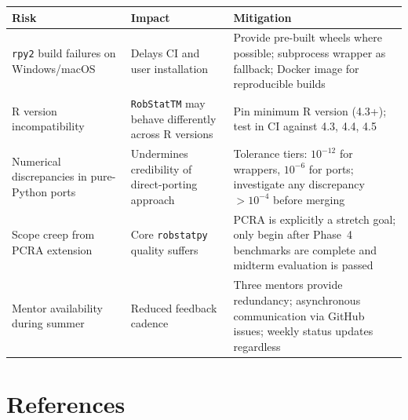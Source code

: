 \documentclass[11pt, a4paper]{article}
\begin{document}
\renewcommand{\arraystretch}{1.3}
\begin{tabularx}{\linewidth}{@{} >{\raggedright\arraybackslash}p{3.5cm}
                                  >{\raggedright\arraybackslash}X
                                  >{\raggedright\arraybackslash}X @{}}
  \toprule
  \textbf{Risk} & \textbf{Impact} & \textbf{Mitigation} \\
  \midrule
  \texttt{rpy2} build failures on Windows/macOS &
  Delays CI and user installation &
  Provide pre-built wheels where possible; subprocess wrapper as fallback;
  Docker image for reproducible builds \\[4pt]

  R version incompatibility &
  \texttt{RobStatTM} may behave differently across R versions &
  Pin minimum R version (4.3+); test in CI against 4.3, 4.4, 4.5 \\[4pt]

  Numerical discrepancies in pure-Python ports &
  Undermines credibility of direct-porting approach &
  Tolerance tiers: $10^{-12}$ for wrappers, $10^{-6}$ for ports;
  investigate any discrepancy $> 10^{-4}$ before merging \\[4pt]

  Scope creep from PCRA extension &
  Core \texttt{robstatpy} quality suffers &
  PCRA is explicitly a stretch goal; only begin after
  Phase~4 benchmarks are complete and midterm evaluation is passed \\[4pt]

  Mentor availability during summer &
  Reduced feedback cadence &
  Three mentors provide redundancy; asynchronous communication
  via GitHub issues; weekly status updates regardless \\
  \bottomrule
\end{tabularx}
\renewcommand{\arraystretch}{1}

\section{References}
\end{document}
